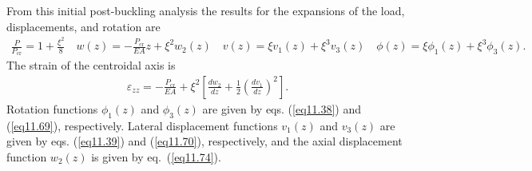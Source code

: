 \documentclass{AeroStructure-ERJohnson}
\begin{document}
From this initial post-buckling analysis the results for the expansions of the load, displacements, and rotation are
\begin{align}\label{eq11.75}
\frac{P}{P_{\mathrm{cr}}}=1+\frac{\xi^{2}}{8} \quad w(z)=-\frac{P_{\mathrm{cr}}}{E A} z+\xi^{2} w_{2}(z) \quad v(z)=\xi v_{1}(z)+\xi^{3} v_{3}(z) \quad \phi(z)=\xi \phi_{1}(z)+\xi^{3} \phi_{3}(z).
\end{align}
The strain of the centroidal axis is
\begin{align}\label{eq11.76}
\varepsilon_{z z}=-\frac{P_{\mathrm{cr}}}{E A}+\xi^{2}\left[\frac{d w_{2}}{d z}+\frac{1}{2}\left(\frac{d v_{1}}{d z}\right)^{2}\right].
\end{align}
Rotation functions $\phi_{1}(z)$ and $\phi_{3}(z)$ are given by eqs. (\ref{eq11.38}) and (\ref{eq11.69}), respectively. Lateral displacement functions $v_{1}(z)$ and $v_{3}(z)$ are given by eqs. (\ref{eq11.39}) and (\ref{eq11.70}), respectively, and the axial displacement function $w_{2}(z)$ is given by eq.~(\ref{eq11.74}).
\end{document}
